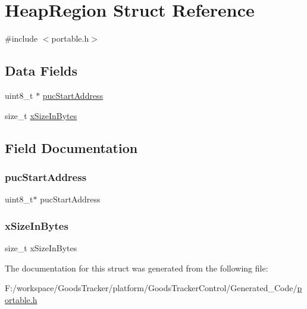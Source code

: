 \hypertarget{struct_heap_region}{}\section{Heap\+Region Struct Reference}
\label{struct_heap_region}


{\ttfamily \#include $<$portable.\+h$>$}

\subsection*{Data Fields}
\begin{DoxyCompactItemize}
\item 
uint8\+\_\+t $\ast$ \hyperlink{struct_heap_region_a9d602a97428bd849298f05391a13968e}{puc\+Start\+Address}
\item 
size\+\_\+t \hyperlink{struct_heap_region_ab0ed41976d9901576b117bc7981f6c98}{x\+Size\+In\+Bytes}
\end{DoxyCompactItemize}


\subsection{Field Documentation}
\mbox{\label{struct_heap_region_a9d602a97428bd849298f05391a13968e}} 
\subsubsection{\texorpdfstring{puc\+Start\+Address}{pucStartAddress}}
{\footnotesize\ttfamily uint8\+\_\+t$\ast$ puc\+Start\+Address}

\mbox{\label{struct_heap_region_ab0ed41976d9901576b117bc7981f6c98}} 
\subsubsection{\texorpdfstring{x\+Size\+In\+Bytes}{xSizeInBytes}}
{\footnotesize\ttfamily size\+\_\+t x\+Size\+In\+Bytes}



The documentation for this struct was generated from the following file\+:\begin{DoxyCompactItemize}
\item 
F\+:/workspace/\+Goods\+Tracker/platform/\+Goods\+Tracker\+Control/\+Generated\+\_\+\+Code/\hyperlink{portable_8h}{portable.\+h}\end{DoxyCompactItemize}
